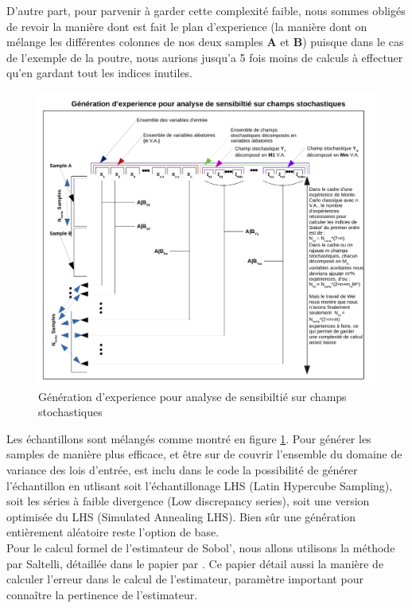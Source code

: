 \documentclass[a4paper,10pt]{article}
\begin{document}
D'autre part, pour parvenir à garder cette complexité faible, nous sommes obligés de revoir la manière dont est fait le plan d'experience (la manière dont on mélange les différentes colonnes de nos deux samples \textbf{A} et \textbf{B}) puisque dans le cas de l'exemple de la poutre, nous aurions jusqu'a 5 fois moins de calculs à effectuer qu'en gardant tout les indices inutiles. \\
\begin{figure}[H]
   \centering   
   \includegraphics[scale=0.75]{Schema_Preparation_VA.pdf}
      \caption{Génération d’experience pour analyse de sensibiltié sur champs stochastiques}
         \label{expGenStoField}
\end{figure}
Les échantillons sont mélangés comme montré en figure \ref{expGenStoField}. 
Pour générer les samples de manière plus efficace, et être sur de couvrir l'ensemble du domaine de variance des lois d'entrée, est inclu dans le code la possibilité de générer l'échantillon en utlisant soit l'échantillonage LHS (Latin Hypercube Sampling), soit les séries à faible divergence (Low discrepancy series), soit une version optimisée du LHS (Simulated Annealing LHS). Bien sûr une génération entièrement aléatoire reste l'option de base.\\

Pour le calcul formel de l'estimateur de Sobol', nous allons utilisons la méthode par Saltelli, détaillée dans le papier par \cite{dumas2017}. Ce papier détail aussi la manière de calculer l'erreur dans le calcul de l'estimateur, paramètre important pour connaître la pertinence de l'estimateur. 
\end{document}
